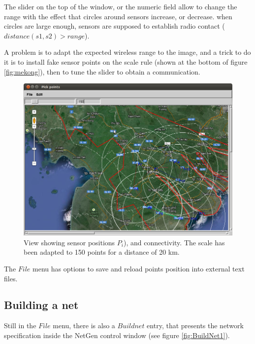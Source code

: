 \documentclass[times]{book}
\begin{document}
The slider on the top of the window, or the numeric field allow to change the range
with the effect that circles around sensors increase, or decrease. when circles
are large enough, sensors are supposed to establish radio contact ($distance(s1,s2) > range$).

A problem is to adapt the expected wireless range to the image, and a  trick
to do it is to install  fake sensor points on the scale rule (shown at the bottom of figure \ref{fig:mekong}), then to tune the slider
to obtain a communication.


\begin{figure}[hbtp]
\begin{center} 
\includegraphics[width=12cm]{PickPoints3.png}
\caption{View showing sensor positions $P_i$), and connectivity.
The scale has been adapted to 150 points for a distance of 20 km.
}
\label{fig:PickPoints3}
\end{center}
\end{figure}

The $File$ menu has options   to save and reload  points position into external text files.

\subsection{Building a net}

Still in the $File$ menu, there is also a $Build net$ entry, that presents the network specification 
inside the NetGen control window (see figure 
\ref{fig:BuildNet1}).
\end{document}
